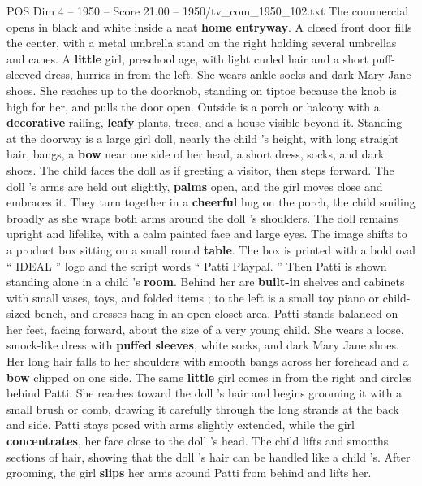 \begin{textsample}{POS Dim 4 – 1950 – Score 21.00 – 1950/tv\_com\_1950\_102.txt}  \label{ex:f4_pos_031}
The commercial opens in black and white inside a neat \textbf{home} \textbf{entryway}.
A closed front door fills the center, with a metal umbrella stand on the right holding several umbrellas and canes.
A \textbf{little} girl, preschool age, with light curled hair and a short puff-sleeved dress, hurries in from the left.
She wears ankle socks and dark Mary Jane shoes.
She reaches up to the doorknob, standing on tiptoe because the knob is high for her, and pulls the door open.
Outside is a porch or balcony with a \textbf{decorative} railing, \textbf{leafy} plants, trees, and a house visible beyond it.
Standing at the doorway is a large girl doll, nearly the child ’s height, with long straight hair, bangs, a \textbf{bow} near one side of her head, a short dress, socks, and dark shoes.
The child faces the doll as if greeting a visitor, then steps forward.
The doll ’s arms are held out slightly, \textbf{palms} open, and the girl moves close and embraces it.
They turn together in a \textbf{cheerful} hug on the porch, the child smiling broadly as she wraps both arms around the doll ’s shoulders.
The doll remains upright and lifelike, with a calm painted face and large eyes.
The image shifts to a product box sitting on a small round \textbf{table}.
The box is printed with a bold oval “ IDEAL ” logo and the script words “ Patti Playpal. ” Then Patti is shown standing alone in a child ’s \textbf{room}.
Behind her are \textbf{built-in} shelves and cabinets with small vases, toys, and folded items ; to the left is a small toy piano or child-sized bench, and dresses hang in an open closet area.
Patti stands balanced on her feet, facing forward, about the size of a very young child.
She wears a loose, smock-like dress with \textbf{puffed} \textbf{sleeves}, white socks, and dark Mary Jane shoes.
Her long hair falls to her shoulders with smooth bangs across her forehead and a \textbf{bow} clipped on one side.
The same \textbf{little} girl comes in from the right and circles behind Patti.
She reaches toward the doll ’s hair and begins grooming it with a small brush or comb, drawing it carefully through the long strands at the back and side.
Patti stays posed with arms slightly extended, while the girl \textbf{concentrates}, her face close to the doll ’s head.
The child lifts and smooths sections of hair, showing that the doll ’s hair can be handled like a child ’s.
After grooming, the girl \textbf{slips} her arms around Patti from behind and lifts her.

\end{textsample}
